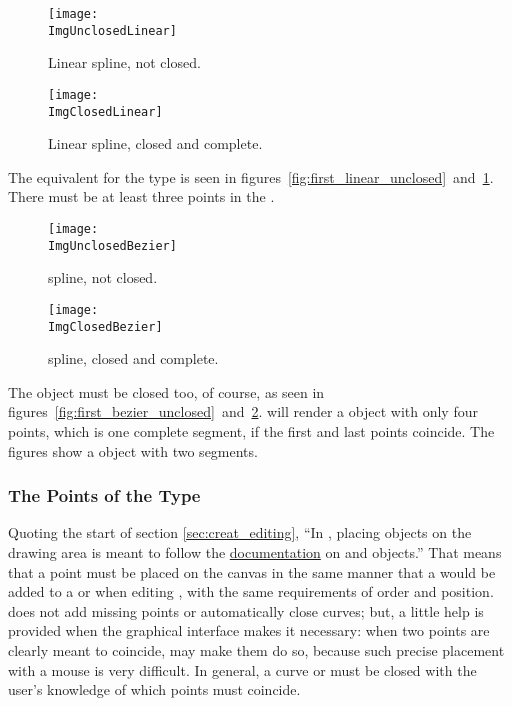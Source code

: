 		\begin{figure}[htb!]
		\centering
		\texttt{[image: \\ImgUnclosedLinear]}
		\caption{Linear spline, not closed.}
		\label{fig:first_linear_unclosed}
		\vspace{16pt}
		\texttt{[image: \\ImgClosedLinear]}
		\caption{Linear spline, closed and complete.}
		\label{fig:first_linear_closed}
		\end{figure}

		The equivalent for the \IXlinear{} \IXspline{} type is seen in
		figures~\ref{fig:first_linear_unclosed}~and~\ref{fig:first_linear_closed}.
		There must be at least three points in the \IXlinear{} \IXspline{}.		

		\begin{figure}[htb!]
		\centering
		\texttt{[image: \\ImgUnclosedBezier]}
		\caption{\dtybezieru{} spline, not closed.}
		\label{fig:first_bezier_unclosed}
		\vspace{16pt}
		\texttt{[image: \\ImgClosedBezier]}
		\caption{\dtybezieru{} spline, closed and complete.}
		\label{fig:first_bezier_closed}
		\end{figure}

		The \IXbezn{} \IXspline{} object must be closed too, of course,
		as seen in
		figures~\ref{fig:first_bezier_unclosed}~and~\ref{fig:first_bezier_closed}.
		\IXpov{} will render a \IXbezn{} \IXspline{} object with only
		four points, which is one complete segment, if the first
		and last points coincide.
		The figures show a \IXbezn{} object
		with two segments.

			\subsubsection{The Points of the \dtybezieru{} Type}%
			\label{sssec:editing_points_bezier}
			Quoting the start of section
			\ref{sec:creat_editing},
			``In \IXpkg{}, placing \IXspline{}
			objects on the drawing area is meant to follow the
			\IXpov{} \href{\URLPOVdocs}{documentation}
			on
			\href{\URLPOVdocsLathe}{\IXlathe{}}
			and
			\href{\URLPOVdocsPrism}{\IXprism{}}
			objects.''
			That means that a point must be placed on the canvas
			in the same manner that a  would
			be added to a \IXprism{} or \IXlathe{} when
			editing ,
			with the same requirements of order and position.
			\IXpkgu{} does not add missing points or
			automatically close curves; but, a little help
			is provided when the graphical interface makes
			it necessary: when two points are clearly meant
			to coincide, \IXpkg{} may make them do so, because
			such precise placement with a mouse is very
			difficult. In general, a curve or 
			must be closed with the user's knowledge of
			which points must coincide.
			
